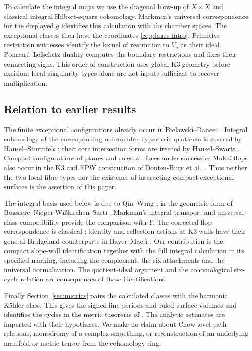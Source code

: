 To calculate the integral maps we use the diagonal blow-up of $X\times X$
and classical integral Hilbert-square cohomology. Markman's universal
correspondence for the displayed $g$ identifies this calculation with
the chamber spaces. The exceptional classes then have the coordinates
\eqref{eq:planes-intro}. Primitive restriction witnesses identify the
kernel of restriction to $V_\sigma$ as their ideal. Poincar\'e--Lefschetz
duality computes the boundary restrictions and fixes their connecting
signs. This order of construction uses global K3 geometry before
excision; local singularity types alone are not inputs sufficient to
recover multiplication.

\subsection{Relation to earlier results}
The finite exceptional configurations already occur in
Bielawski--Dancer \cite[Example~6.10]{bd}. Integral cohomology of the
corresponding unimodular hypertoric quotients is covered by
Hausel--Sturmfels \cite[Theorem~1.1]{hs}; their core intersection forms
are treated by Hausel--Swartz \cite[Theorem~2]{hsw}.
Compact configurations of planes and ruled surfaces under successive
Mukai flops also occur in the K3 and EPW construction of
Donten-Bury et al.\ \cite[\S3.1 and Remark~6.17]{epw}.
Thus neither the two local fibre types nor the existence of interacting
compact exceptional surfaces is the assertion of this paper.

The integral basis used below is due to Qin--Wang
\cite[Theorem~5.4 and Remark~5.6]{qw}, in the geometric form of
Boissi\`ere--Nieper-Wi\ss kirchen--Sarti \cite[Remark~5.7]{bns}.
Markman's integral transport and universal-class compatibility
\cite{markman08} provide the comparison with $Y$.
The corrected flop correspondence is classical
\cite{riess,llw}; identity and reflection actions at K3 walls have
their general Bridgeland counterparts in
Bayer--Macr\`i \cite[Lemma~10.1]{bm}.
Our contribution is the compact slope-wall identification together
with the full integral calculation in its specified marking, including
the complement, the six attachments and the universal normalization.
The quotient-ideal argument and the cohomological six-cycle relation
are consequences of these identifications.

Finally Section~\ref{sec:metrics} pairs the calculated classes with the
harmonic K\"ahler class. This gives the signed line periods and ruled
surface volumes and identifies the cycles in the metric theorems of
\cite{wuebben17,wuebben18}. The analytic estimates are imported with
their hypotheses. We make no claim about Chow-level path relations,
monodromy of a complex smoothing, or reconstruction of an underlying
manifold or metric tensor from the cohomology ring.
